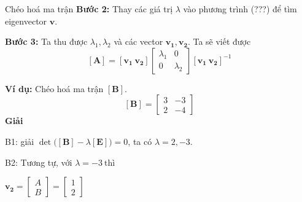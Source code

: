 \begin{frame}{Chéo hoá ma trận}
    \textbf{Bước 2:} Thay các giá trị \(\lambda\) vào phương trình (???) để tìm eigenvector \(\mathbf{v}\).
    \vspace{2mm}

    \textbf{Bước 3:} Ta thu được \(\lambda_1, \lambda_2\) và các vector \(\mathbf{v_1}, \mathbf{v_2}\). Ta sẽ viết được
    \begin{equation}
        \mathbf{[A]} = \left[\mathbf{v_1} \ \mathbf{v_2}\right] 
        \left[
        \begin{array}{cc}
        \lambda_1 & 0 \\
        0 & \lambda_2 
        \end{array}
        \right] \left[\mathbf{v_1} \ \mathbf{v_2}\right]^{-1}
        \label{eq:3.4_6}
    \end{equation}
    \begin{center}
        \begin{minipage}{0.45\linewidth}
            \textbf{Ví dụ:} Chéo hoá ma trận \(\mathbf{[B]}\).
            \begin{equation*}
                \mathbf{[B]} = 
                \left[
                \begin{array}{cc}
                    3 & -3 \\
                    2 & -4
                \end{array}
                \right]
            \end{equation*}
            \textbf{Giải}

            B1: giải \(\det \Big(\mathbf{[B]} - \lambda \mathbf{[E]} \Big)=0\), ta có \(\lambda = 2,-3\).
        \end{minipage}
        \hspace{5mm}
        \begin{minipage}{0.45\linewidth}
            B2: Tương tự, với \(\lambda = -3 \ \text{thì}\) 
            \vspace{2mm}
            
            \( \mathbf{v_2} = \left[
            \begin{array}{c}
            A \\
            B
            \end{array}\right] = \left[
            \begin{array}{c}
            1 \\
            2
            \end{array}\right]  \)


\end{minipage}
\end{center}
\end{frame}
